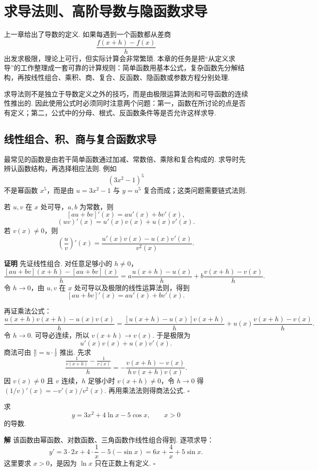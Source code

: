 \documentclass[fontset=fandol]{ctexart}
\newcounter{DefinitionCounter}[section]
\newcounter{TheoremCounter}[section]
\newcounter{PropositionCounter}[section]
\newcounter{ExampleCounter}[section]
\newcounter{ExerciseCounter}[section]
\newenvironment{proofdetail}{\par\noindent\textbf{证明}\quad}{\hfill$\square$\par\vspace{0.8em}}
\newenvironment{solution}{\par\noindent\textbf{解}\quad}{\hfill$\square$\par\vspace{0.8em}}
\newcommand{\renewEnvironmentCounter}{\setcounter{DefinitionCounter}{0}\setcounter{TheoremCounter}{0}\setcounter{PropositionCounter}{0}\setcounter{ExampleCounter}{0}\setcounter{ExerciseCounter}{0}}
\begin{document}
\section{求导法则、高阶导数与隐函数求导}
\renewEnvironmentCounter

上一章给出了导数的定义. 如果每遇到一个函数都从差商
\[
\frac{f(x+h)-f(x)}{h}
\]
出发求极限，理论上可行，但实际计算会非常繁琐. 本章的任务是把“从定义求导”的工作整理成一套可靠的计算规则：简单函数用基本公式，复杂函数先分解结构，再按线性组合、乘积、商、复合、反函数、隐函数或参数方程分别处理.

求导法则不是独立于导数定义之外的技巧，而是由极限运算法则和可导函数的连续性推出的. 因此使用公式时必须同时注意两个问题：第一，函数在所讨论的点是否有定义；第二，公式中的分母、根式、反函数条件等是否允许这样求导.

\subsection{线性组合、积、商与复合函数求导}

最常见的函数是由若干简单函数通过加减、常数倍、乘除和复合构成的. 求导时先辨认函数结构，再选择相应法则. 例如
\[
(3x^2-1)^5
\]
不是幂函数 $x^5$，而是由 $u=3x^2-1$ 与 $y=u^5$ 复合而成；这类问题需要链式法则.

\begin{theorem}
若 $u,v$ 在 $x$ 处可导，$a,b$ 为常数，则
\[
[au+bv]'(x)=au'(x)+bv'(x),
\]
\[
(uv)'(x)=u'(x)v(x)+u(x)v'(x).
\]
若 $v(x)\neq0$，则
\[
\left(\frac{u}{v}\right)'(x)=\frac{u'(x)v(x)-u(x)v'(x)}{v^2(x)}.
\]
\end{theorem}
\begin{proofdetail}
先证线性组合. 对任意足够小的 $h\neq0$，
\[
\frac{[au+bv](x+h)-[au+bv](x)}{h}
=a\frac{u(x+h)-u(x)}{h}
+b\frac{v(x+h)-v(x)}{h}.
\]
令 $h\to0$，由 $u,v$ 在 $x$ 处可导以及极限的线性运算法则，得到
\[
[au+bv]'(x)=au'(x)+bv'(x).
\]

再证乘法公式：
\[
\frac{u(x+h)v(x+h)-u(x)v(x)}{h}
=\frac{[u(x+h)-u(x)]v(x+h)}{h}+u(x)\frac{v(x+h)-v(x)}{h}.
\]
令 $h\to0$. 可导必连续，所以 $v(x+h)\to v(x)$. 于是极限为
\[
u'(x)v(x)+u(x)v'(x).
\]
商法可由 $\frac{u}{v}=u\cdot\frac1v$ 推出. 先求
\[
\frac{\frac1{v(x+h)}-\frac1{v(x)}}{h}
=-\frac{v(x+h)-v(x)}{h\,v(x+h)v(x)}.
\]
因 $v(x)\neq0$ 且 $v$ 连续，$h$ 足够小时 $v(x+h)\neq0$，令 $h\to0$ 得 $(1/v)'(x)=-v'(x)/v^2(x)$. 再用乘法法则得商法公式.
\end{proofdetail}

\begin{example}[线性组合求导]
求
\[
y=3x^2+4\ln x-5\cos x,\qquad x>0
\]
的导数.
\end{example}
\begin{solution}
该函数由幂函数、对数函数、三角函数作线性组合得到. 逐项求导：
\[
y'=3\cdot 2x+4\cdot\frac1x-5(-\sin x)
=6x+\frac4x+5\sin x.
\]
这里要求 $x>0$，是因为 $\ln x$ 只在正数上有定义.
\end{solution}
\end{document}
